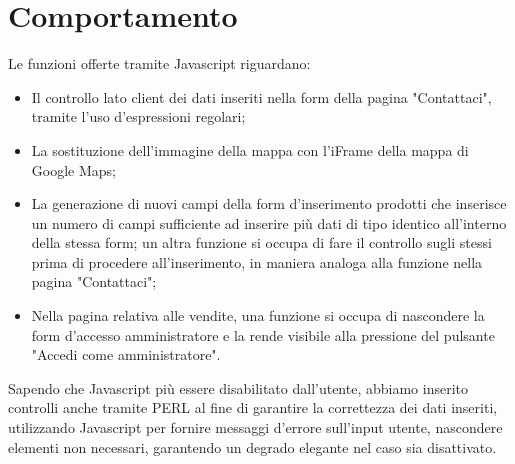 \section{Comportamento}{
	Le funzioni offerte tramite Javascript riguardano: 
	\begin{itemize}
		\item Il controllo lato client dei dati inseriti nella form della pagina "Contattaci", tramite l'uso d'espressioni regolari;
		\item La sostituzione dell'immagine della mappa con l'iFrame della mappa di Google Maps;
		\item La generazione di nuovi campi della form d'inserimento prodotti che inserisce un numero di campi sufficiente ad inserire più dati di tipo identico all'interno della stessa form; un altra funzione si occupa di fare il controllo sugli stessi prima di procedere all'inserimento, in maniera analoga alla funzione nella pagina "Contattaci";
		\item Nella pagina relativa alle vendite, una funzione si occupa di nascondere la form d'accesso amministratore e la rende visibile alla pressione del pulsante "Accedi come amministratore".
	\end{itemize}%
	Sapendo che Javascript più essere disabilitato dall'utente, abbiamo inserito controlli anche tramite PERL al fine di garantire la correttezza dei dati inseriti, utilizzando Javascript per fornire messaggi d'errore sull'input utente, nascondere elementi non necessari, garantendo un degrado elegante nel caso sia disattivato.
}